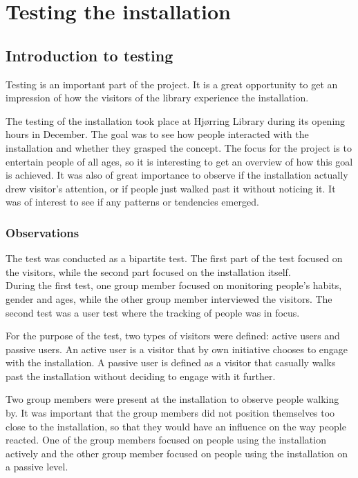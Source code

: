 \chapter{Testing the installation}
\section{Introduction to testing}
Testing is an important part of the project. It is a great opportunity to get an impression of how the visitors of the library experience the installation.


The testing of the installation took place at Hj{\o}rring Library during its opening hours in December. The goal was to see how people interacted with the installation and whether they grasped the concept. The focus for the project is to entertain people of all ages, so it is interesting to get an overview of how this goal is achieved. It was also of great importance to observe if the installation actually drew visitor's attention, or if people just walked past it without noticing it. It was of interest to see if any patterns or tendencies emerged.

\subsection{Observations}
The test was conducted as a bipartite test. The first part of the test focused on the visitors, while the second part focused on the installation itself.\\
During the first test, one group member focused on monitoring people's habits, gender and ages, while the other group member interviewed the visitors. The second test was a user test where the tracking of people was in focus.

For the purpose of the test, two types of visitors were defined: active users and passive users. An active user is a visitor that by own initiative chooses to engage with the installation. A passive user is defined as a visitor that casually walks past the installation without deciding to engage with it further.

Two group members were present at the installation to observe people walking by. It was important that the group members did not position themselves too close to the installation, so that they would have an influence on the way people reacted. One of the group members focused on people using the installation actively and the other group member focused on people using the installation on a passive level.\\

